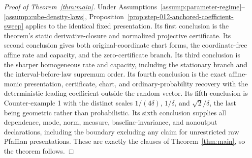 \begin{proof}[Proof of Theorem~\ref{thm:main}]
Under Assumptions~\ref{assump:parameter-regime}--\ref{assump:cube-density-laws},
Proposition~\ref{prop:step-012-anchored-coefficient-sweep} applies to the
identical fixed presentation.  Its first conclusion is the theorem's static
derivative-closure and normalized projective certificate.  Its second
conclusion gives both original-coordinate chart forms, the coordinate-free
affine rate and capacity, and the zero-certificate branch.  Its third
conclusion is the sharper homogeneous rate and capacity, including the
stationary branch and the interval-before-law supremum order.  Its fourth
conclusion is the exact affine-monic presentation, certificate, chart, and
ordinary-probability recovery with the deterministic leading coefficient
outside the random vector.  Its fifth conclusion is Counter-example 1 with
the distinct scales $1/(4\delta)$, $1/\delta$, and $\sqrt2/\delta$, the last
being geometric rather than probabilistic.  Its sixth conclusion supplies
all dependence, mode, norm, measure, baseline-invariance, and nonoutput
declarations, including the boundary excluding any claim for unrestricted
raw Pfaffian presentations.  These are exactly the clauses of
Theorem~\ref{thm:main}, so the theorem follows.
\end{proof}
